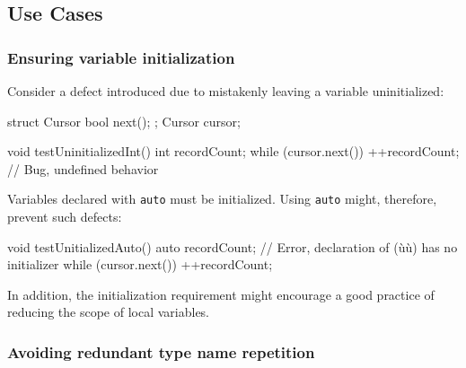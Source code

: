 \subsection[Use Cases]{Use Cases}\label{use-cases-auto}

\subsubsection[Ensuring variable initialization]{Ensuring variable initialization}\label{ensuring-variable-initialization}

Consider a defect introduced due to mistakenly leaving a variable
uninitialized:

\begin{emcppshiddenlisting}[emcppsbatch=e4]
struct Cursor {
    bool next();
};
Cursor cursor;
\end{emcppshiddenlisting}
\begin{emcppslisting}[emcppsbatch=e4]
void testUninitializedInt()
{
    int recordCount;
    while (cursor.next()) { ++recordCount; }  // Bug, undefined behavior
}
\end{emcppslisting}

\noindent Variables declared with \lstinline!auto! must be initialized. Using
\lstinline!auto! might, therefore, prevent such defects:

\begin{emcppslisting}[emcppsbatch=e4,emcppserrorlines={4}]
void testUnitializedAuto()
{
    auto recordCount; // Error, declaration of (ù{}ù) has no initializer
    while (cursor.next()) { ++recordCount; }
}
\end{emcppslisting}

\noindent In addition, the initialization requirement might encourage a good
practice of reducing the scope of local variables.

\subsubsection[Avoiding redundant type name repetition]{Avoiding redundant type name repetition}\label{avoiding-redundant-type-name-repetition}

